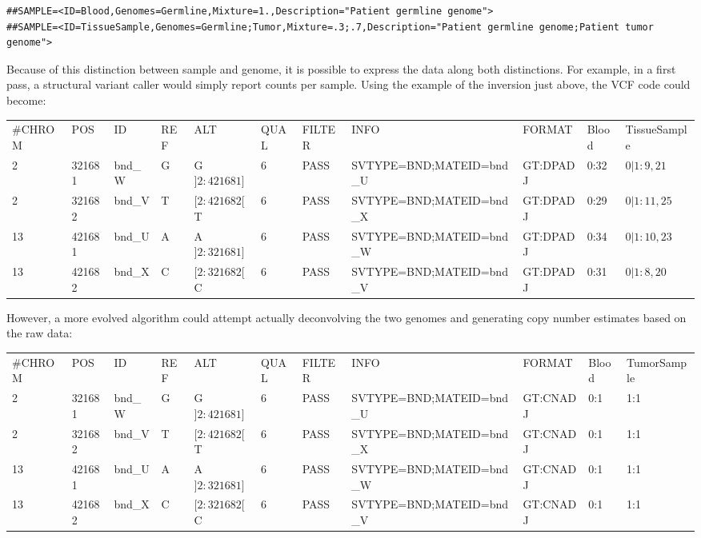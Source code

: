 \documentclass[8pt]{article}
\begin{document}
\footnotesize
\begin{verbatim}
##SAMPLE=<ID=Blood,Genomes=Germline,Mixture=1.,Description="Patient germline genome">
##SAMPLE=<ID=TissueSample,Genomes=Germline;Tumor,Mixture=.3;.7,Description="Patient germline genome;Patient tumor genome">
\end{verbatim}
\normalsize

Because of this distinction between sample and genome, it is possible to express the data along both distinctions.
For example, in a first pass, a structural variant caller would simply report counts per sample.
Using the example of the inversion just above, the VCF code could become:

\vspace{0.3cm}
\tiny
\begin{flushleft}
\begin{tabular}{ l l l l l l l l l l l }
\#CHROM & POS & ID & REF & ALT & QUAL & FILTER & INFO & FORMAT & Blood & TissueSample\\
2 & 321681 & bnd\_W & G & G$]2:421681]$ & 6 & PASS & SVTYPE=BND;MATEID=bnd\_U & GT:DPADJ & 0:32 & $0|1:9,21$ \\
2 & 321682 & bnd\_V & T & $[2:421682[$T & 6 & PASS & SVTYPE=BND;MATEID=bnd\_X & GT:DPADJ & 0:29 & $0|1:11,25$ \\
13 & 421681 & bnd\_U & A & A$]2:321681]$ & 6 & PASS & SVTYPE=BND;MATEID=bnd\_W & GT:DPADJ & 0:34 & $0|1:10,23$ \\
13 & 421682 & bnd\_X & C & $[2:321682[$C & 6 & PASS & SVTYPE=BND;MATEID=bnd\_V & GT:DPADJ & 0:31 & $0|1:8,20$ \\
\end{tabular}
\end{flushleft}
\normalsize
\vspace{0.3cm}

However, a more evolved algorithm could attempt actually deconvolving the two genomes and generating copy number estimates based on the raw data:

\vspace{0.3cm}
\tiny
\begin{flushleft}
\begin{tabular}{ l l l l l l l l l l l }
\#CHROM & POS & ID & REF & ALT & QUAL & FILTER & INFO & FORMAT & Blood & TumorSample \\
2 & 321681 & bnd\_W & G & G$]2:421681]$ & 6 & PASS & SVTYPE=BND;MATEID=bnd\_U & GT:CNADJ & 0:1 & 1:1 \\
2 & 321682 & bnd\_V & T & $[2:421682[$T & 6 & PASS & SVTYPE=BND;MATEID=bnd\_X & GT:CNADJ & 0:1 & 1:1 \\
13 & 421681 & bnd\_U & A & A$]2:321681]$ & 6 & PASS & SVTYPE=BND;MATEID=bnd\_W & GT:CNADJ & 0:1 & 1:1 \\
13 & 421682 & bnd\_X & C & $[2:321682[$C & 6 & PASS & SVTYPE=BND;MATEID=bnd\_V & GT:CNADJ & 0:1 & 1:1 \\
\end{tabular}
\end{flushleft}
\normalsize
\end{document}
